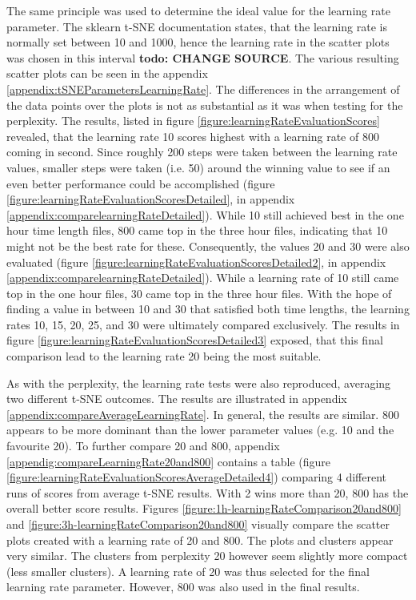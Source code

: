 The same principle was used to determine the ideal value for the learning rate parameter. The sklearn t-SNE documentation states, that the learning rate is normally set between 10 and 1000, hence the learning rate in the scatter plots was chosen in this interval \textbf{todo: CHANGE SOURCE}.
The various resulting scatter plots can be seen in the appendix \ref{appendix:tSNEParametersLearningRate}. The differences in the arrangement of the data points over the plots is not as substantial as it was when testing for the perplexity. The results, listed in figure \ref{figure:learningRateEvaluationScores} revealed, that the learning rate 10 scores highest with a learning rate of 800 coming in second. Since roughly 200 steps were taken between the learning rate values, smaller steps were taken (i.e. 50) around the winning value to see if an even better performance could be accomplished (figure \ref{figure:learningRateEvaluationScoresDetailed}, in appendix \ref{appendix:comparelearningRateDetailed}). While 10 still achieved best in the one hour time length files, 800 came top in the three hour files, indicating that 10 might not be the best rate for these. Consequently, the values 20 and 30 were also evaluated (figure \ref{figure:learningRateEvaluationScoresDetailed2}, in appendix \ref{appendix:comparelearningRateDetailed}). While a learning rate of 10 still came top in the one hour files, 30 came top in the three hour files. With the hope of finding a value in between 10 and 30 that satisfied both time lengths, the learning rates 10, 15, 20, 25, and 30 were ultimately compared exclusively. The results in figure \ref{figure:learningRateEvaluationScoresDetailed3} exposed, that this final comparison lead to the learning rate 20 being the most suitable. 

As with the perplexity, the learning rate tests were also reproduced, averaging two different t-SNE outcomes. The results are illustrated in appendix \ref{appendix:compareAverageLearningRate}. In general, the results are similar. 800 appears to be more dominant than the lower parameter values (e.g. 10 and the favourite 20). To further compare 20 and 800, appendix \ref{appendig:compareLearningRate20and800} contains a table (figure \ref{figure:learningRateEvaluationScoresAverageDetailed4}) comparing 4 different runs of scores from average t-SNE results. With 2 wins more than 20, 800 has the overall better score results. Figures \ref{figure:1h-learningRateComparison20and800} and \ref{figure:3h-learningRateComparison20and800} visually compare the scatter plots created with a learning rate of 20 and 800. The plots and clusters appear very similar. The clusters from perplexity 20 however seem slightly more compact (less smaller clusters). A learning rate of 20 was thus selected for the final learning rate parameter. However, 800 was also used in the final results.

